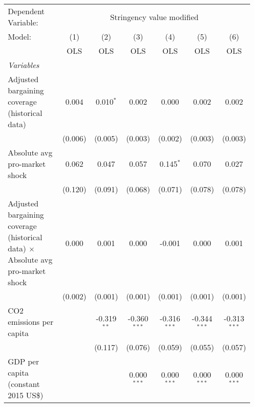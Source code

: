 
\begingroup
\centering
\begin{tabular}{lcccccc}
   \toprule
   Dependent Variable: & \multicolumn{6}{c}{Stringency value modified}\\
   Model:                                                                                 & (1)     & (2)           & (3)            & (4)            & (5)            & (6)\\  
                                                                                          &  OLS    & OLS           & OLS            & OLS            & OLS            & OLS\\  
   \midrule
   \emph{Variables}\\
   Adjusted bargaining coverage (historical data)                                         & 0.004   & 0.010$^{*}$   & 0.002          & 0.000          & 0.002          & 0.002\\   
                                                                                          & (0.006) & (0.005)       & (0.003)        & (0.002)        & (0.003)        & (0.003)\\   
   Absolute avg pro-market shock                                                          & 0.062   & 0.047         & 0.057          & 0.145$^{*}$    & 0.070          & 0.027\\   
                                                                                          & (0.120) & (0.091)       & (0.068)        & (0.071)        & (0.078)        & (0.078)\\   
   Adjusted bargaining coverage (historical data) $\times$ Absolute avg pro-market shock  & 0.000   & 0.001         & 0.000          & -0.001         & 0.000          & 0.001\\   
                                                                                          & (0.002) & (0.001)       & (0.001)        & (0.001)        & (0.001)        & (0.001)\\   
   CO2 emissions per capita                                                               &         & -0.319$^{**}$ & -0.360$^{***}$ & -0.316$^{***}$ & -0.344$^{***}$ & -0.313$^{***}$\\   
                                                                                          &         & (0.117)       & (0.076)        & (0.059)        & (0.055)        & (0.057)\\   
   GDP per capita (constant 2015 US\$)                                                    &         &               & 0.000$^{***}$  & 0.000$^{***}$  & 0.000$^{***}$  & 0.000$^{***}$\\   

\end{tabular}
